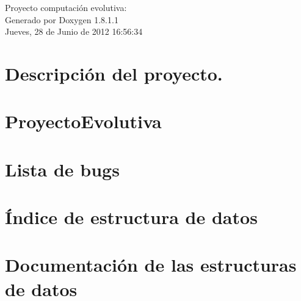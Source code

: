 \documentclass{book}
\begin{document}
\hypersetup{pageanchor=false,citecolor=blue}
\begin{titlepage}
\vspace*{7cm}
\begin{center}
{\Large Proyecto computación evolutiva\-: }\\
\vspace*{1cm}
{\large Generado por Doxygen 1.8.1.1}\\
\vspace*{0.5cm}
{\small Jueves, 28 de Junio de 2012 16:56:34}\\
\end{center}
\end{titlepage}
\clearemptydoublepage
{}
\tableofcontents
\clearemptydoublepage
{}
\hypersetup{pageanchor=true,citecolor=blue}
\chapter{Descripción del proyecto.}
\label{index}\hypertarget{index}{}
\chapter{Proyecto\-Evolutiva}
\label{md_README}
\hypertarget{md_README}{}

\chapter{Lista de bugs}
\label{bug}
\hypertarget{bug}{}

\chapter{Índice de estructura de datos}

\chapter{Documentación de las estructuras de datos}








\printindex
\end{document}
